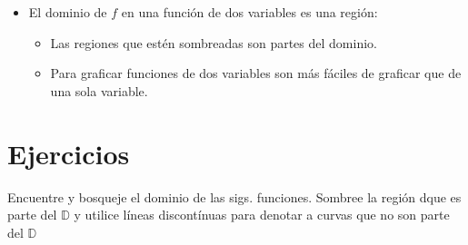 \begin{itemize}
    \item El dominio de $f$ en una función de dos variables es una región:
        \begin{itemize}
            \item Las regiones que estén sombreadas son partes del dominio.
        \end{itemize}
        \begin{itemize}[label=\#]
            \item Para graficar funciones de dos variables son más fáciles de graficar que de una sola variable.
        \end{itemize}
\end{itemize}


\section{Ejercicios}
Encuentre y bosqueje el dominio de las sigs. funciones. \newline 
Sombree la región dque es parte del $\mathbb{D}$ y utilice líneas discontínuas para denotar a curvas que no son parte del $\mathbb{D}$
